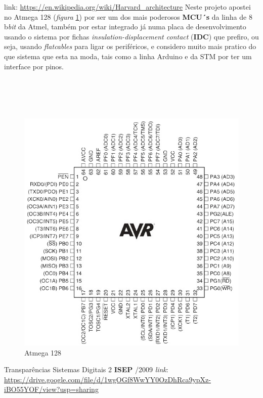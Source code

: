 \qquad link: \url{https://en.wikipedia.org/wiki/Harvard_architecture}
\newpage
Neste projeto apostei no Atmega 128 (\textit{figura} \ref{Atmega_128_pinagem}) por ser um dos mais poderosos \textbf{MCU´s} da linha de 8 b\textit{bit} da Atmel, também por estar integrado já numa placa de desenvolvimento usando o sistema por fichas \textit{insulation-displacement contact} (\textbf{IDC}) que prefiro, ou seja, usando \textit{flatcables} para ligar os periféricos, e considero muito mais pratico do que sistema que esta na moda, tais como a linha Arduino e da STM por ter um interface por pinos.
\\
\\
\\
\\
\\
\begin{figure}[H]
	\centering
	\includegraphics[scale=0.7]{./image/PESTA/material/Atmega128_1.jpg}
	\caption{Atmega 128}
	\label{Atmega_128_pinagem}
\end{figure}
{Transparências Sistemas Digitais 2 \quad \textbf{ISEP} /2009 \quad \textit{link}}:
\\
\url{https://drive.google.com/file/d/1wgOGf8WwYY0OzDhRca9ypXz-iBO55YOF/view?usp=sharing}
